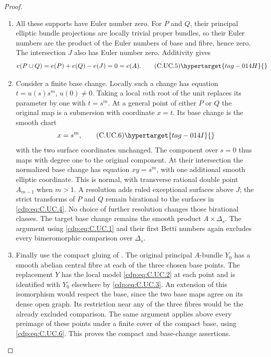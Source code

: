 \begin{proof}
\begin{enumerate}[label=\arabic*.,leftmargin=*]
\item All these supports have Euler number zero.
For $P$ and $Q$, their principal elliptic
bundle projections are locally trivial
proper bundles, so their Euler numbers are
the product of the Euler numbers of base
and fibre, hence zero. The intersection
$J$ also has Euler number zero. Additivity
gives
\[
                    e(P\cup Q)=e(P)+e(Q)-e(J)=0=e(A).
\tag{C.UC.5}\hypertarget{tag-014H}{}\label{cdp:eq:C.UC.5}
\]

\item Consider a finite base change.
Locally such a change has equation
$t=u(s)s^m$, $u(0)\ne0$. Taking a local
$m$th root of the unit replaces its
parameter by one with $t=s^m$.
At a general point of either $P$ or $Q$
the original map is a submersion with
coordinate $x=t$. Its base change is the
smooth chart
\[
                          x=s^m,
\tag{C.UC.6}\hypertarget{tag-014I}{}\label{cdp:eq:C.UC.6}
\]
with the two surface coordinates unchanged.
The component over $s=0$ thus maps with
degree one to the original component.
At their intersection the normalized base
change has equation $xy=s^m$, with one
additional smooth elliptic coordinate.
This is normal, with transverse rational
double point $A_{m-1}$ when $m>1$.
A resolution adds ruled exceptional
surfaces above $J$; the strict transforms
of $P$ and $Q$ remain birational to the
surfaces in \eqref{cdp:eq:C.UC.4}. No choice of further
resolution changes those birational
classes. The target base change remains
the smooth product $A\times\Delta_s$.
The argument using \eqref{cdp:eq:C.UC.1} and their
first Betti numbers again excludes every
bimeromorphic comparison over $\Delta_s$.

\item Finally use the compact gluing of .
The original principal $A$-bundle $Y_0$
has a smooth abelian central fibre at
each of the three chosen base points.
The replacement $Y$ has the local model
\eqref{cdp:eq:C.UC.2} at each point and is identified
with $Y_0$ elsewhere by \eqref{cdp:eq:C.UC.3}.
An extension of this isomorphism would
respect the base, since the two base
maps agree on its dense open graph.
Its restriction near any of the three
fibres would be the already excluded
comparison. The same argument applies
above every preimage of these points
under a finite cover of the compact base,
using \eqref{cdp:eq:C.UC.6}. This proves the compact
and base-change assertions.


\end{enumerate}
\end{proof}
